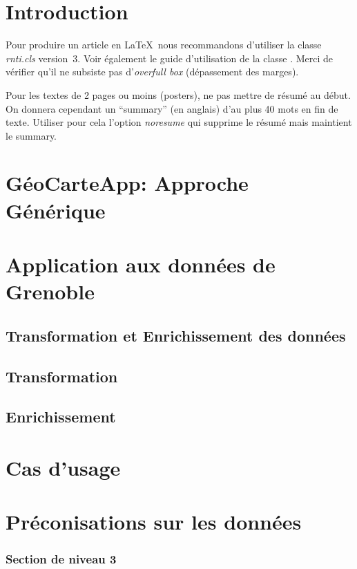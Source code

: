 \documentclass[a4paper,pagenum,french,showlayout]{rnti}
\affiliation{
    \affil{1}Univ Lyon, MINES Saint-\'Etienne, CNRS, Laboratoire Hubert Curien UMR 5516, \\F-42023 Saint-\'Etienne, France\\
          \{prenom.nom\}@emse.fr\\
    \affil{2}Mondeca, \\ 35 boulevard Strasbourg, Paris, France\\
          ghislain.atemezing@mondeca.com\\
 }
\begin{document}
%
\section{Introduction}

Pour produire un article en \LaTeX\ nous recommandons d'utiliser la
classe \textit{rnti.cls} version~3. Voir également le guide
d'utilisation de la classe \citep{ritschard:2005rnti}. Merci de
vérifier qu'il ne subsiste pas d'\emph{overfull box} (dépassement
des marges).

Pour les textes de 2 pages ou moins (posters), ne pas mettre de
résumé au début. On donnera cependant un ``summary'' (en anglais)
d'au plus 40 mots en fin de texte. Utiliser pour cela l'option
\textit{noresume} qui supprime le résumé mais maintient le summary.

\section{GéoCarteApp: Approche Générique}

\section{Application aux données de Grenoble}

\subsection{Transformation et Enrichissement des données}

\subsection{Transformation}

\subsection{Enrichissement}


\section{Cas d'usage}

\section{Préconisations sur les données}


\subsubsection{Section de niveau 3}
\end{document}
